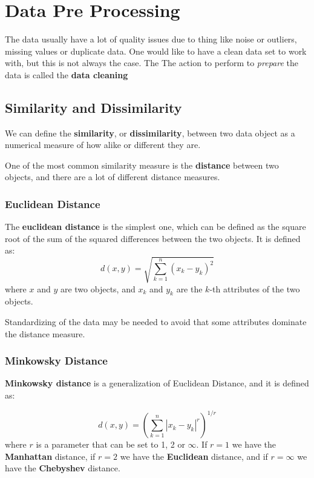 \chapter{Data Pre Processing}
The data usually have a lot of quality issues due to thing like noise
or outliers, missing values or duplicate data. One would like to have
a clean data set to work with, but this is not always the case.  The
The action to perform to \textit{prepare} the data is called the
\textbf{data cleaning}

\section{Similarity and Dissimilarity}
\begin{boxH}
  We can define the \textbf{similarity}, or \textbf{dissimilarity},
  between two data object as a numerical measure of how alike or
  different they are.
\end{boxH}
One of the most common similarity measure is the \textbf{distance} 
between two objects, and there are a lot of different distance
measures.

\subsection{Euclidean Distance}
The \textbf{euclidean distance} is the simplest one, which can be
defined as the square root of the sum of the squared differences
between the two objects. It is defined as:
\begin{equation}
  d(x,y) = \sqrt{\sum\limits_{k=1}^n (x_k - y_k)^2 }
\end{equation}
where $x$ and $y$ are two objects, and $x_k$ and $y_k$ are the $k$-th
attributes of the two objects.

Standardizing of the data may be needed to avoid that some attributes
dominate the distance measure.

\subsection{Minkowsky Distance}
\textbf{Minkowsky distance} is a generalization of Euclidean Distance,
and it is defined as:

\begin{equation}
  d(x,y) = (\sum\limits_{k=1}^n | x_k - y_k |^r )^{1/r} 
\end{equation}
where $r$ is a parameter that can be set to 1, 2 or $\infty$.
If $r=1$ we have the \textbf{Manhattan} distance, if $r=2$ we have the 
\textbf{Euclidean} distance, and if $r=\infty$ we have the 
\textbf{Chebyshev} distance.


